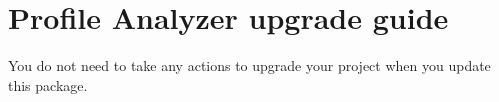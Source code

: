 \chapter{Profile Analyzer upgrade guide}
\hypertarget{md__library_2_package_cache_2com_8unity_8performance_8profile-analyzer_0d1_82_82_2_documentation_0i_2upgrade-guide}{}\label{md__library_2_package_cache_2com_8unity_8performance_8profile-analyzer_0d1_82_82_2_documentation_0i_2upgrade-guide}
\label{md__library_2_package_cache_2com_8unity_8performance_8profile-analyzer_0d1_82_82_2_documentation_0i_2upgrade-guide_autotoc_md446}%
%
 You do not need to take any actions to upgrade your project when you update this package. 